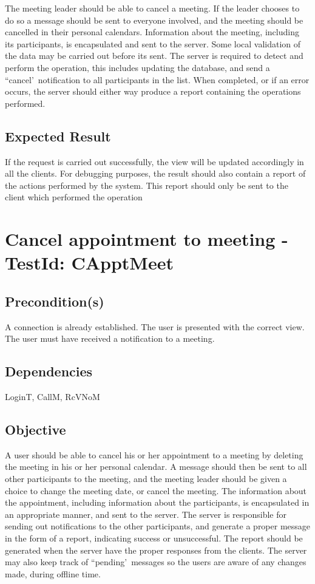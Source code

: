 \documentclass{article}
\begin{document}
The meeting leader should be able to cancel a meeting. If the leader chooses
to do so a message should be sent to everyone involved, and the meeting
should be cancelled in their personal calendars. Information about the
meeting, including its participants, is encapsulated and sent to the server.
Some local validation of the data may be carried out before its sent. The
server is required to detect and perform the operation, this includes
updating the database, and send a ``cancel'\ notification to all
participants in the list. When completed, or if an error occurs, the server
should either way produce a report containing the operations performed.

\subsection{Expected Result}

If the request is carried out successfully, the view will be updated
accordingly in all the clients. For debugging purposes, the result should
also contain a report of the actions performed by the system. This report
should only be sent to the client which performed the operation \newpage

\section{Cancel appointment to meeting - TestId: CApptMeet}

\subsection{Precondition(s)}

A connection is already established. The user is presented with the correct
view. The user must have received a notification to a meeting.

\subsection{Dependencies}

LoginT, CallM, RcVNoM

\subsection{Objective}

A user should be able to cancel his or her appointment to a meeting by
deleting the meeting in his or her personal calendar. A message should then
be sent to all other participants to the meeting, and the meeting leader
should be given a choice to change the meeting date, or cancel the meeting.
The information about the appointment, including information about the
participants, is encapsulated in an appropriate manner, and sent to the
server. \bigskip The server is responsible for sending out notifications to
the other participants, and generate a proper message in the form of a
report, indicating success or unsuccessful. The report should be generated
when the server have the proper responses from the clients. The server may
also keep track of ``pending'\ messages so the users are aware of any
changes made, during offline time.
\end{document}
